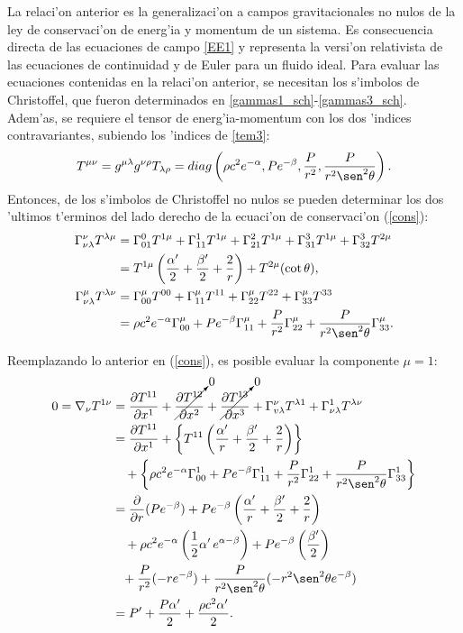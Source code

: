 La relaci'on anterior es la generalizaci'on a campos gravitacionales no nulos de la ley de conservaci'on de energ'ia y momentum de un sistema. Es consecuencia directa de las ecuaciones de campo \eqref{EE1} y representa la versi'on relativista de las ecuaciones de continuidad y de Euler para un fluido ideal. Para evaluar las ecuaciones contenidas en la relaci'on anterior, se necesitan los s'imbolos de Christoffel, que fueron determinados en \eqref{gammas1_sch}-\eqref{gammas3_sch}. Adem'as, se requiere el tensor de energ'ia-momentum con los dos 'indices contravariantes, subiendo los 'indices de \eqref{tem3}:
\begin{equation}
 T^{\mu\nu}=g^{\mu\lambda}g^{\nu\rho}T_{\lambda\rho}=diag\left(\rho c^2 e^{-\alpha},P e^{-\beta},\frac{P}{r^2}, \frac{P}{r^2\sen^2\theta}\right).
\end{equation}
Entonces, de los s'imbolos de Christoffel no nulos se pueden determinar los dos 'ultimos t'erminos del lado derecho de la ecuaci'on de conservaci'on (\ref{cons}):
\begin{align}
 \Gamma^{\nu}_{\nu\lambda}T^{\lambda\mu}&=\Gamma_{01}^{0}T^{1\mu}+\Gamma_{11}^{1}T^{1\mu}+\Gamma_{21}^{2}T^{1\mu}+\Gamma_{31}^3T^{1\mu}+\Gamma_{32}^3T^{2\mu}\\&=T^{1\mu}\left(\frac{\alpha'}{2}+\frac{\beta'}{2}+\frac{2}{r}\right)+T^{2\mu}(\cot\theta),\\
\Gamma^{\mu}_{\nu\lambda}T^{\lambda\nu}&=\Gamma_{00}^{\mu}T^{00}+\Gamma_{11}^{\mu}T^{11}+\Gamma_{22}^{\mu}T^{22}+\Gamma_{33}^{\mu}T^{33}\\&=\rho c^2e^{-\alpha}\Gamma^{\mu}_{00}+Pe^{-\beta}\Gamma^{\mu}_{11}+\frac{P}{r^2}\Gamma^{\mu}_{22}+\frac{P}{r^2\sen^2\theta}\Gamma^{\mu}_{33}.
\end{align}

Reemplazando lo anterior en (\ref{cons}), es posible evaluar la componente $\mu=1$:
\begin{align}
 0=\nabla_{\nu}T^{1\nu}&=\frac{\partial T^{11}}{\partial x^1}+\cancelto{0}{\frac{\partial T^{12}}{\partial x^2}}+\cancelto{0}{\frac{\partial T^{13}}{\partial x^3}}+\Gamma_{v\lambda}^{\nu}T^{\lambda1}+\Gamma_{\nu\lambda}^{1}T^{\lambda\nu}\\
&=\frac{\partial T^{11}}{\partial x^1}+\left\{T^{11}\left(\frac{\alpha'}{r}+\frac{\beta'}{2}+\frac{2}{r}\right)\right\} \nonumber\\
&\quad+\left\{\rho c^2 e^{-\alpha}\Gamma^{1}_{00}+Pe^{-\beta}\Gamma^{1}_{11}+\frac{P}{r^2}\Gamma^{1}_{22}+\frac{P}{r^2\sen^2\theta}\Gamma^{1}_{33}\right\}\\
&=\frac{\partial}{\partial r}(Pe^{-\beta})+Pe^{-\beta}\left(\frac{\alpha'}{r}+\frac{\beta'}{2}+\frac{2}{r}\right) \nonumber\\
&\quad+\rho c^2 e^{-\alpha}\left(\frac{1}{2}\alpha'\, e^{\alpha-\beta}\right)+Pe^{-\beta}\left(\frac{\beta'}{2}\right) \nonumber\\
&\phantom{+}+\frac{P}{r^2}(-re^{-\beta})+\frac{P}{r^2\sen^2\theta}(-r^2\sen^2\theta e^{-\beta})\\
&=P'+\frac{P\alpha'}{2}+\frac{\rho c^2 \alpha'}{2}.
\end{align}

